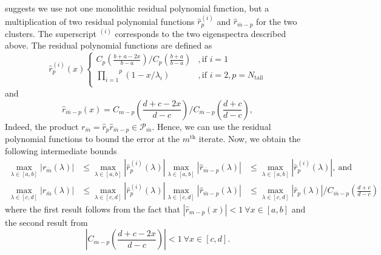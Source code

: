 \citeauthor{cg_sharpened_convrate_Axelsson1976} suggests we use not one monolithic residual polynomial function, but a multiplication of two residual polynomial functions $\hat{r}^{(i)}_p$ and $\hat{r}_{\bar{m}-p}$ for the two clusters. The superscript $^{(i)}$ corresponds to the two eigenspectra described above. The residual polynomial functions are defined as
\begin{equation}
    \hat{r}^{(i)}_p (x)
    \begin{cases}
        C_p \left(\frac{b + a - 2x}{b - a}\right) / C_p\left(\frac{b + a}{b - a}\right)&, \text{if } i = 1\\
        \overset{p}{\underset{i=1}{\prod}} (1 - x/\lambda_i)&, \text{if } i = 2, p = N_{\text{tail}}\\
    \end{cases}
    \label{eq:residual_polynomial_rm}
\end{equation}
and
\begin{equation}
    \hat{r}_{{\bar{m}}-p} (x) = C_{m-p} \left(\frac{d + c - 2x}{d - c}\right) / C_{{\bar{m}}-p}\left(\frac{d + c}{d - c}\right),
    \label{eq:residual_polynomial_rpm}
\end{equation}
Indeed, the product $r_{\bar{m}} = \hat{r}_p \hat{r}_{\bar{m}-p} \in \mathcal{P}_{\bar{m}}$. Hence, we can use the residual polynomial functions to bound the error at the $m^{\text{th}}$ iterate. Now, we obtain the following intermediate bounds
\begin{subequations}
    \begin{align}
        \max_{\lambda \in [a,b]} |r_{\bar{m}}(\lambda)| &\leq \max_{\lambda \in [a,b]} |\hat{r}^{(i)}_p(\lambda)| \max_{\lambda \in [a,b]} |\hat{r}_{\bar{m}-p}(\lambda)| &\leq \max_{\lambda \in [a,b]} |\hat{r}^{(i)}_p(\lambda)|, \ \text{and} \label{eq:residual_polynomial_bound_ab}\\
        \max_{\lambda \in [c,d]} |r_{\bar{m}}(\lambda)| &\leq \max_{\lambda \in [c,d]} |\hat{r}^{(i)}_p(\lambda)| \max_{\lambda \in [c,d]} |\hat{r}_{\bar{m}-p}(\lambda)| &\leq \max_{\lambda \in [c,d]} |\hat{r}_{p}(\lambda)|/C_{\bar{m}-p}\left(\frac{d+c}{d-c}\right) \label{eq:residual_polynomial_bound_cd}
    \end{align}
\end{subequations}
where the first result follows from the fact that $|\hat{r}_{m-p}(x)| < 1 \ \forall x \in [a,b]$ and the second result from 
\[
    \left|C_{m-p}\left(\frac{d+c -2x}{d-c}\right)\right| < 1 \ \forall x \in [c,d].
\]

